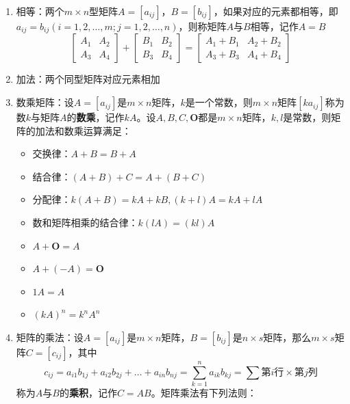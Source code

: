 \documentclass[./linear_algebra.tex]{subfiles}
\begin{document}
    \begin{enumerate}
        \item 相等：两个$m \times n$型矩阵$A = [a_{ij}]$，$B = [b_{ij}]$，如果对应的元素都相等，即$a_{ij} = b_{ij}(i = 1,2,\dots,m; j = 1,2,\dots,n)$，则称矩阵$A$与$B$相等，记作$A = B$
        \[
            \begin{bmatrix}
                A_1 & A_2 \\
                A_3 & A_4
            \end{bmatrix}
            + \begin{bmatrix}
                  B_1 & B_2 \\
                  B_3 & B_4
            \end{bmatrix}
            = \begin{bmatrix}
                  A_1 + B_1 & A_2 + B_2 \\
                  A_3 + B_3 & A_4 + B_4
            \end{bmatrix}
        \]        \item 加法：两个同型矩阵对应元素相加
        \item 数乘矩阵：设$A = [a_{ij}]$是$m \times n$矩阵，$k$是一个常数，则$m \times n$矩阵$[ka_{ij}]$称为数$k$与矩阵$A$的\textbf{数乘}，记作$kA$。设$A, B, C, \mathbf{O}$都是$m \times n$矩阵，$k, l$是常数，则矩阵的加法和数乘运算满足：
        \begin{itemize}
            \item 交换律：$A + B = B + A$
            \item 结合律：$(A + B) + C = A + (B + C)$
            \item 分配律：$k(A + B) = kA + kB, (k + l)A = kA + lA$
            \item 数和矩阵相乘的结合律：$k(lA) = (kl)A$
            \item $A + \mathbf{O} = A$
            \item $A + (-A) = \mathbf{O}$
            \item $1A = A$
            \item $(kA)^n = k^{n}A^n$
        \end{itemize}
        \item 矩阵的乘法：设$A = [a_{ij}]$是$m \times n$矩阵，$B = [b_{ij}]$是$n \times s$矩阵，那么$m \times s$矩阵$C = [c_{ij}]$，其中
        \[
            c_{ij} = a_{i1}b_{1j} + a_{i2}b_{2j} + \dots + a_{in}b_{nj} = \sum_{k=1}^{n} a_{ik}b_{kj} = \sum \text{第$i$行} \times \text{第$j$列}
        \]
        称为$A$与$B$的\textbf{乘积}，记作$C = AB$。矩阵乘法有下列法则：

\end{enumerate}
\end{document}
